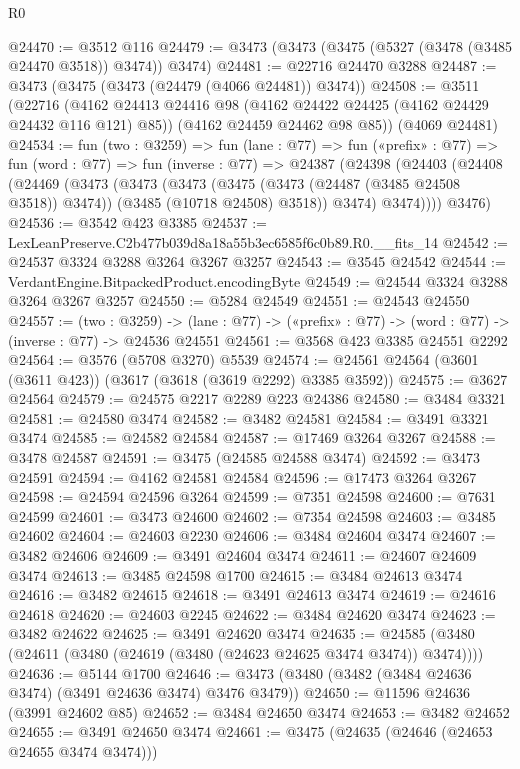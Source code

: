 \begin{lexlean}{R0}
\begin{coremodule}
@24470 := @3512 @116
@24479 := @3473 (@3473 (@3475 (@5327 (@3478 (@3485 @24470 @3518)) @3474)) @3474)
@24481 := @22716 @24470 @3288
@24487 := @3473 (@3475 (@3473 (@24479 (@4066 @24481)) @3474))
@24508 := @3511
    (@22716
      (@4162 @24413 @24416 @98 (@4162 @24422 @24425 (@4162 @24429 @24432 @116 @121) @85))
      (@4162 @24459 @24462 @98 @85))
    (@4069 @24481)
@24534 := fun (two : @3259) =>
  fun (lane : @77) =>
  fun («prefix» : @77) =>
  fun (word : @77) =>
  fun (inverse : @77) =>
  @24387
    (@24398
      (@24403
        (@24408
          (@24469
            (@3473
              (@3473
                (@3473
                  (@3475 (@3473 (@24487 (@3485 @24508 @3518)) @3474))
                  (@3485 (@10718 @24508) @3518))
                @3474)
              @3474))))
      @3476)
@24536 := @3542 @423 @3385
@24537 := LexLeanPreserve.C2b477b039d8a18a55b3ec6585f6c0b89.R0.__fits_14
@24542 := @24537 @3324 @3288 @3264 @3267 @3257
@24543 := @3545 @24542
@24544 := VerdantEngine.BitpackedProduct.encodingByte
@24549 := @24544 @3324 @3288 @3264 @3267 @3257
@24550 := @5284 @24549
@24551 := @24543 @24550
@24557 := (two : @3259) ->
  (lane : @77) -> («prefix» : @77) -> (word : @77) -> (inverse : @77) -> @24536 @24551
@24561 := @3568 @423 @3385 @24551 @2292
@24564 := @3576 (@5708 @3270) @5539
@24574 := @24561 @24564 (@3601 (@3611 @423)) (@3617 (@3618 (@3619 @2292) @3385 @3592))
@24575 := @3627 @24564
@24579 := @24575 @2217 @2289 @223 @24386
@24580 := @3484 @3321
@24581 := @24580 @3474
@24582 := @3482 @24581
@24584 := @3491 @3321 @3474
@24585 := @24582 @24584
@24587 := @17469 @3264 @3267
@24588 := @3478 @24587
@24591 := @3475 (@24585 @24588 @3474)
@24592 := @3473 @24591
@24594 := @4162 @24581 @24584
@24596 := @17473 @3264 @3267
@24598 := @24594 @24596 @3264
@24599 := @7351 @24598
@24600 := @7631 @24599
@24601 := @3473 @24600
@24602 := @7354 @24598
@24603 := @3485 @24602
@24604 := @24603 @2230
@24606 := @3484 @24604 @3474
@24607 := @3482 @24606
@24609 := @3491 @24604 @3474
@24611 := @24607 @24609 @3474
@24613 := @3485 @24598 @1700
@24615 := @3484 @24613 @3474
@24616 := @3482 @24615
@24618 := @3491 @24613 @3474
@24619 := @24616 @24618
@24620 := @24603 @2245
@24622 := @3484 @24620 @3474
@24623 := @3482 @24622
@24625 := @3491 @24620 @3474
@24635 := @24585 (@3480 (@24611 (@3480 (@24619 (@3480 (@24623 @24625 @3474 @3474)) @3474))))
@24636 := @5144 @1700
@24646 := @3473 (@3480 (@3482 (@3484 @24636 @3474) (@3491 @24636 @3474) @3476 @3479))
@24650 := @11596 @24636 (@3991 @24602 @85)
@24652 := @3484 @24650 @3474
@24653 := @3482 @24652
@24655 := @3491 @24650 @3474
@24661 := @3475 (@24635 (@24646 (@24653 @24655 @3474 @3474)))

\end{coremodule}
\end{lexlean}
